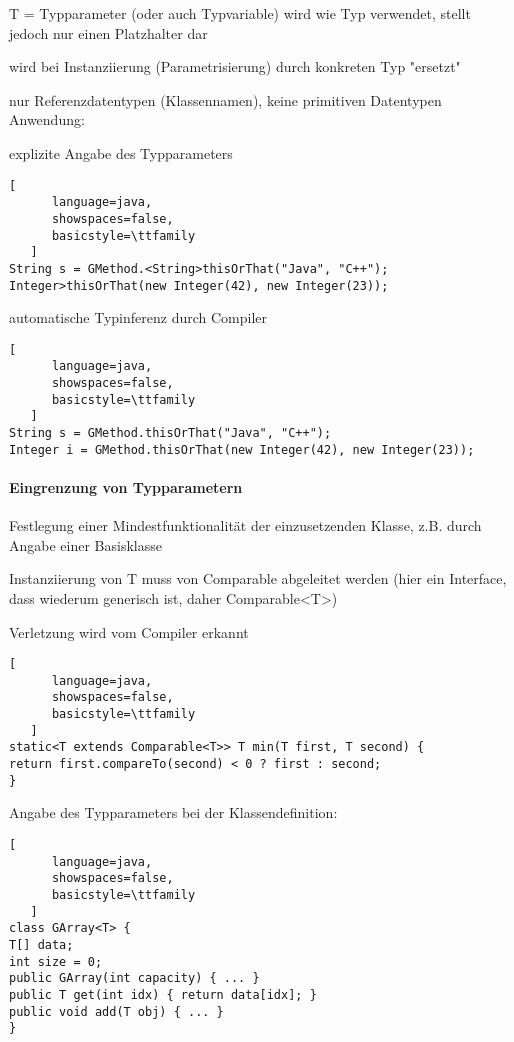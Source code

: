 \documentclass[10pt]{article}
\begin{document}
\begin{itemize*}
  \item T = Typparameter (oder auch Typvariable) wird wie Typ verwendet, stellt jedoch nur einen Platzhalter dar
  \item wird bei Instanziierung (Parametrisierung) durch konkreten Typ "ersetzt"
  \item nur Referenzdatentypen (Klassennamen), keine primitiven Datentypen
  Anwendung:
  \item explizite Angabe des Typparameters
  \begin{lstlisting}[
      language=java,
      showspaces=false,
      basicstyle=\ttfamily
   ]
String s = GMethod.<String>thisOrThat("Java", "C++");
Integer>thisOrThat(new Integer(42), new Integer(23));
\end{lstlisting}
  
  \item automatische Typinferenz durch Compiler
  \begin{lstlisting}[
      language=java,
      showspaces=false,
      basicstyle=\ttfamily
   ]
String s = GMethod.thisOrThat("Java", "C++");
Integer i = GMethod.thisOrThat(new Integer(42), new Integer(23));
\end{lstlisting}
\end{itemize*}


\paragraph{Eingrenzung von Typparametern}
Festlegung einer Mindestfunktionalität der einzusetzenden Klasse, z.B. durch Angabe einer Basisklasse
\begin{itemize*}
  \item Instanziierung von T muss von Comparable abgeleitet werden (hier ein Interface, dass wiederum generisch ist, daher Comparable<T>)
  \item Verletzung wird vom Compiler erkannt
\end{itemize*}
\begin{lstlisting}[
      language=java,
      showspaces=false,
      basicstyle=\ttfamily
   ]
static<T extends Comparable<T>> T min(T first, T second) {
return first.compareTo(second) < 0 ? first : second;
}
\end{lstlisting}

Angabe des Typparameters bei der Klassendefinition:
\begin{lstlisting}[
      language=java,
      showspaces=false,
      basicstyle=\ttfamily
   ]
class GArray<T> {
T[] data;
int size = 0;
public GArray(int capacity) { ... }
public T get(int idx) { return data[idx]; }
public void add(T obj) { ... }
}
\end{lstlisting}
\end{document}
